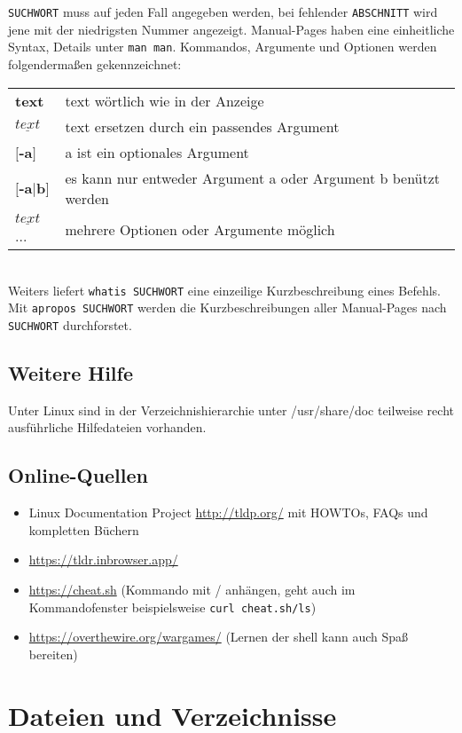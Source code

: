 \documentclass[11pt]{article}
\begin{document}
\texttt{SUCHWORT} muss auf jeden Fall angegeben werden, bei fehlender
\texttt{ABSCHNITT} wird jene mit der niedrigsten Nummer angezeigt.
Manual-Pages haben eine einheitliche Syntax, Details unter \texttt{man
man}. Kommandos, Argumente und Optionen werden folgendermaßen gekennzeichnet:

\begin{tabular}{ll}
\textbf{text} & text wörtlich wie in der Anzeige \\
$ \underline{text}$ & text ersetzen durch ein passendes Argument \\
$[$\textbf{-a}$]$ & a ist ein optionales Argument \\
$[$\textbf{-a$|$b}$]$ & es kann nur entweder Argument a oder Argument b benützt
werden \\
$ \underline{text}$... &  mehrere Optionen oder Argumente möglich\\
\end{tabular} \\

Weiters liefert \texttt{whatis SUCHWORT} eine einzeilige
Kurzbeschreibung eines Befehls.  Mit \texttt{apropos SUCHWORT} werden
die Kurzbeschreibungen aller Manual-Pages nach \texttt{SUCHWORT}
durchforstet.

\subsection{Weitere Hilfe}
Unter Linux sind in der Verzeichnishierarchie unter /usr/share/doc
teilweise recht ausführliche Hilfedateien vorhanden. 

\subsection{Online-Quellen}
\begin{itemize}
\item Linux Documentation Project \url{http://tldp.org/} mit HOWTOs, FAQs und kompletten Büchern

\item \url{https://tldr.inbrowser.app/}
\item \url{https://cheat.sh} (Kommando mit / anhängen, geht auch im Kommandofenster beispielsweise \texttt{curl cheat.sh/ls})
\item \url{https://overthewire.org/wargames/} (Lernen der shell kann auch Spaß bereiten)
\end{itemize}


\section{Dateien und Verzeichnisse}
\end{document}
